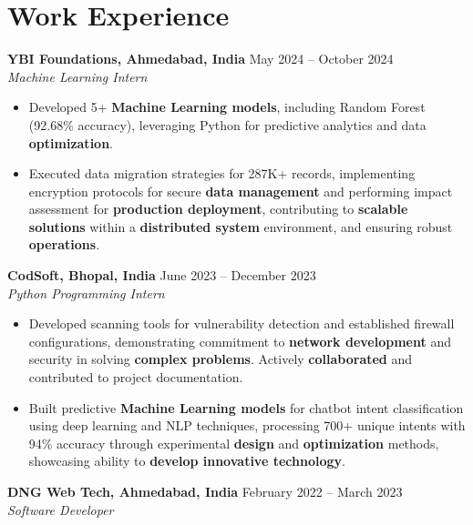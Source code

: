 \documentclass[a4paper,10pt]{article}
\begin{document}
\section*{Work Experience}
\textbf{YBI Foundations, Ahmedabad, India} \hfill May 2024 -- October 2024\\
\textit{Machine Learning Intern} \\
\begin{itemize}[leftmargin=*, itemsep=0pt, parsep=1pt]
\vspace{-6mm}
\item Developed 5+ \textbf{Machine Learning models}, including Random Forest (92.68\% accuracy), leveraging Python for predictive analytics and data \textbf{optimization}.
\item Executed data migration strategies for 287K+ records, implementing encryption protocols for secure \textbf{data management} and performing impact assessment for \textbf{production deployment}, contributing to \textbf{scalable solutions} within a \textbf{distributed system} environment, and ensuring robust \textbf{operations}.
\end{itemize}
\textbf{CodSoft, Bhopal, India} \hfill June 2023 -- December 2023\\
\textit{Python Programming Intern} \\
\begin{itemize}[leftmargin=*, itemsep=0pt, parsep=1pt]
\vspace{-6mm}
\item Developed scanning tools for vulnerability detection and established firewall configurations, demonstrating commitment to \textbf{network development} and security in solving \textbf{complex problems}. Actively \textbf{collaborated} and contributed to project documentation.
\item Built predictive \textbf{Machine Learning models} for chatbot intent classification using deep learning and NLP techniques, processing 700+ unique intents with 94\% accuracy through experimental \textbf{design} and \textbf{optimization} methods, showcasing ability to \textbf{develop innovative technology}.
\vspace{-1mm}
\end{itemize}

\textbf{DNG Web Tech, Ahmedabad, India} \hfill February 2022 -- March 2023 \\
\textit{Software Developer} \\
\end{document}
